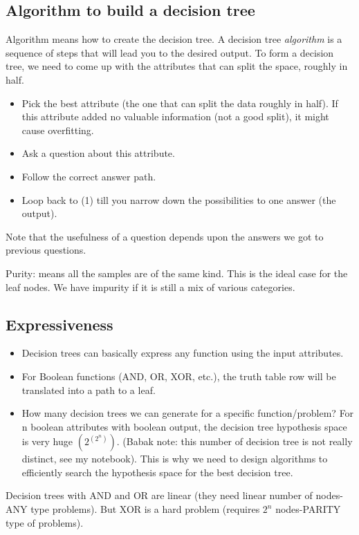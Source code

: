 \documentclass[12pt]{report}
\begin{document}
\subsection{Algorithm to build a decision tree}
Algorithm means how to create the decision tree. A decision tree \textit{algorithm} is a sequence of steps that will lead you to the desired output. To form a decision tree, we need to come up with the attributes that can split the space, roughly in half.
\begin{itemize}
\item Pick the best attribute (the one that can split the data roughly in half). If this attribute added no valuable information (not a good split), it might cause overfitting.
\item Ask a question about this attribute.
\item Follow the correct answer path.
\item Loop back to (1) till you narrow down the possibilities to one answer (the output).
\end{itemize}
Note that the usefulness of a question depends upon the answers we got to previous questions.

Purity: means all the samples are of the same kind. This is the ideal case for the leaf nodes. We have impurity if it is still a mix of various categories.

\subsection{Expressiveness}

\begin{itemize}
	\item Decision trees can basically express any function using the input attributes.
	\item For Boolean functions (AND, OR, XOR, etc.), the truth table row will be translated into a path to a leaf.
	\item How many decision trees we can generate for a specific function/problem? For n boolean attributes with boolean output, the decision tree hypothesis space is very huge $(2^{(2^{n})})$. (Babak note:  this number of decision tree is not really distinct, see my notebook).
	This is why we need to design algorithms to efficiently search the hypothesis space for the best decision tree.
\end{itemize}

Decision trees with AND and OR are linear (they need linear number of nodes-ANY type problems). But XOR is a hard problem (requires $2^n$ nodes-PARITY type of problems).
\end{document}
